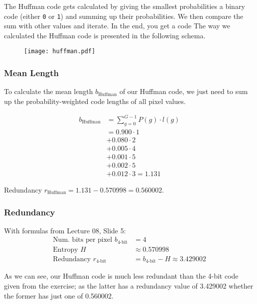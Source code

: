 \documentclass[a4paper,12pt]{article}
\begin{document}
	The Huffman code gets calculated by giving the smallest probabilities a binary code (either \texttt{0} or \texttt{1}) and summing up their probabilities. We then compare the sum with other values and iterate. In the end, you get a code The way we calculated the Huffman code is presented in the following schema.
	
	\begin{figure}[h!]
		\centering
		\texttt{[image: huffman.pdf]}
	\end{figure}
	
	\newpage
	
	\subsubsection{Mean Length}
	
	To calculate the mean length $b_\text{Huffman}$ of our Huffman code, we just need to sum up the probability-weighted code lengths of all pixel values.
	
	\begin{align*}
		b_\text{Huffman} &= \sum\limits_{g = 0}^{G - 1} P(g) \cdot l(g)\\
			&= 0.900 \cdot 1\\
			&+ 0.080 \cdot 2\\
			&+ 0.005 \cdot 4\\
			&+ 0.001 \cdot 5\\
			&+ 0.002 \cdot 5\\
			&+ 0.012 \cdot 3 = 1.131
	\end{align*}
	
	{\footnotesize Redundancy $r_\text{Huffman} = 1.131 - 0.570998 = 0.560002$.}
	
	\subsubsection{Redundancy}
	
	{\footnotesize With formulas from Lecture 08, Slide 5:}
	\begin{align*}
		\text{Num. bits per pixel }b_\text{4-bit} &= 4 \\
		\text{Entropy }H &\approx 0.570998\\
		\text{Redundancy }r_\text{4-bit} &= b_\text{4-bit} - H \approx 3.429002
	\end{align*}
	
	
	\noindent As we can see, our Huffman code is much less redundant than the 4-bit code given from the exercise; as the latter has a redundancy value of 3.429002 whether the former has just one of 0.560002.
	
\end{document}
